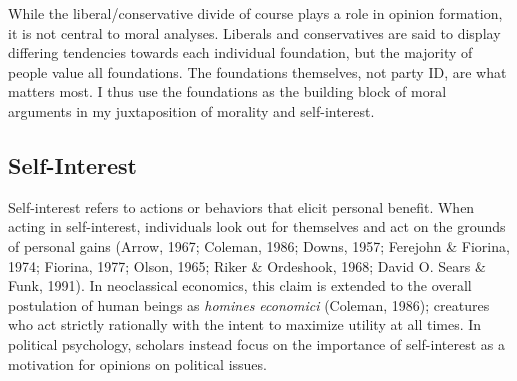 \documentclass[12pt,econ]{sources/authesis}
\begin{document}
While the liberal/conservative divide of course plays a role in opinion formation, it is not central to moral analyses. Liberals and conservatives are said to display differing tendencies towards each individual foundation, but the majority of people value all foundations. The foundations themselves, not party ID, are what matters most. I thus use the foundations as the building block of moral arguments in my juxtaposition of morality and self-interest.

\hypertarget{framing-theory-self_interest}{%
\subsection{Self-Interest}\label{framing-theory-self_interest}}

Self-interest refers to actions or behaviors that elicit personal benefit. When acting in self-interest, individuals look out for themselves and act on the grounds of personal gains (Arrow, 1967; Coleman, 1986; Downs, 1957; Ferejohn \& Fiorina, 1974; Fiorina, 1977; Olson, 1965; Riker \& Ordeshook, 1968; David O. Sears \& Funk, 1991). In neoclassical economics, this claim is extended to the overall postulation of human beings as \textit{homines economici} (Coleman, 1986); creatures who act strictly rationally with the intent to maximize utility at all times. In political psychology, scholars instead focus on the importance of self-interest as a motivation for opinions on political issues.
\end{document}
